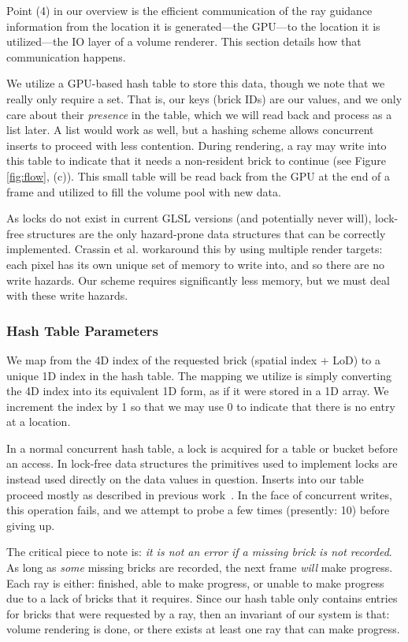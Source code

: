 Point (4) in our overview is the efficient communication of the ray
guidance information from the location it is generated---the GPU---to
the location it is utilized---the IO layer of a volume renderer.  This
section details how that communication happens.

We utilize a GPU-based hash table to store this data, though we note
that we really only require a set.  That is, our keys (brick IDs) are
our values, and we only care about their \emph{presence} in the table,
which we will read back and process as a list later.  A list would work
as well, but a hashing scheme allows concurrent inserts to proceed with
less contention.  During rendering, a ray may write into this table to
indicate that it
needs a non-resident brick to continue (see Figure \ref{fig:flow},
(c)).  This small table will be read back from the GPU at the end of a
frame and utilized to fill the volume pool with new data.

As locks do not exist in current GLSL versions (and potentially never
will), lock-free structures are the only hazard-prone data structures
that can be correctly implemented.  Crassin et
al.\cite{Crassin:2009:Gigavoxels} workaround this by using multiple
render targets: each pixel has its own unique set of memory to
write into, and so there are no write hazards.  Our scheme requires
significantly less memory, but we must deal with these write hazards.

\subsubsection{Hash Table Parameters}
\label{sec:ht-params}

We map from the 4D index of the requested brick (spatial index + LoD)
to a unique 1D index in the hash table.  The mapping we utilize is
simply converting the 4D index into its equivalent 1D form, as if it
were stored in a 1D array.  We increment the index by 1 so that we may
use 0 to indicate that there is no entry at a location.

In a normal concurrent hash table, a lock is acquired for a table or
bucket before an access.  In lock-free data structures the primitives
used to implement locks are instead used directly on the data values
in question.  Inserts into our table proceed mostly as described in
previous
work~\cite{Michael:2002:LockFreeHT}.  In the face of concurrent
writes, this operation fails, and we attempt to probe a few times
(presently: 10) before giving up.

The critical piece to note is: \emph{it is not an error if a
missing brick is not recorded}.  As long as \emph{some}
missing bricks are recorded, the next frame \emph{will} make progress.
Each ray is either: finished, able to make progress, or unable to make
progress due to a lack of bricks that it requires.  Since our hash
table only contains entries for bricks that were requested by a ray,
then an invariant of our system is that: volume rendering is done, or
there exists at least one ray that can make progress.

